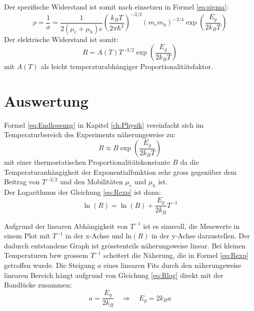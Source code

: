 \documentclass[a4paper]{scrartcl}
\begin{document}
Der spezifische Widerstand ist somit nach einsetzen in Formel \ref{eq:sigma}:
\begin{equation}
\rho = \frac{1}{\sigma} = \frac{1}{2 (\mu_e + \mu_h)e} \left(\frac{k_B T}{2 \pi \hbar^2}\right)^{-3/2} (m_e m_h)^{-3/4} \exp \left(\frac{E_g}{2 k_B T}\right)
\end{equation}
Der elektrische Widerstand ist somit:
\begin{equation}
\label{eq:Endloesung}
R = A(T) T^{-3/2} \exp \left(\frac{E_g}{2 k_B T}\right)
\end{equation}
mit $A(T)$ als leicht temperaturabhängiger Proportionalitätsfaktor. 

\clearpage


\section{Auswertung}

Formel \ref{eq:Endloesung} in Kapitel \ref{ch:Physik} vereinfacht sich im Temperaturbereich des Experiments näherungsweise zu:
\begin{equation}
\label{eq:Rexp}
R \approx B \exp \left(\frac{E_g}{2 k_B T}\right)
\end{equation}
mit einer thermostatischen Proportionalitätskonstante $B$ da die Temperaturanhängigkeit der Exponentialfunktion sehr gross gegenüber dem Beitrag von $T^{-3/2}$ und den Mobilitäten $\mu_e$ und $\mu_h$ ist.
\\
Der Logarithmus der Gleichung \ref{eq:Rexp} ist dann:
\begin{equation}
\label{eq:Rlog}
\ln(R) = \ln (B) + \frac{E_g}{2 k_B} T^{-1}
\end{equation}

Aufgrund der linearen Abhängigkeit von $T^{-1}$ ist es sinnvoll, die Messwerte in einem Plot mit $T^{-1}$ in der x-Achse und ln$(R)$ in der y-Achse darzustellen. Der dadurch entstandene Graph ist grösstenteils näherungsweise linear. Bei kleinen Temperaturen bzw grossem $T^{-1}$ scheitert die Näherung, die in Formel \ref{eq:Rexp} getroffen wurde. Die Steigung $a$ eines linearen Fits durch den näherungsweise linearen Bereich hängt aufgrund von Gleichung \ref{eq:Rlog} direkt mit der Bandlücke zusammen:
\begin{equation}
\label{eq:bandgap}
a = \frac{E_g}{2 k_B} \quad \Rightarrow \quad E_g = 2 k_B a
\end{equation}
\end{document}
